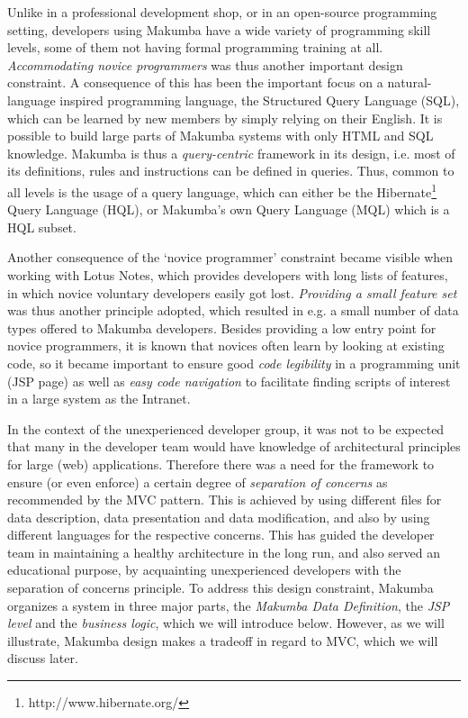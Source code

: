 \documentclass{chi2009}
\begin{document}
Unlike in a professional development shop, or in an open-source programming setting, developers using Makumba have a wide variety of programming skill levels, some of them not having formal programming training at all. \textit{Accommodating novice programmers} was thus another important design constraint.
A consequence of this has been the important focus on a natural-language inspired programming language, the Structured Query Language (SQL), which can be learned by new members by simply relying on their English. It is possible to build large parts of Makumba systems with only HTML and SQL knowledge. Makumba is thus a \textit{query-centric} framework in its design, i.e. most of its definitions, rules and instructions can be defined in queries. Thus, common to all levels is the usage of a query language, which can either be the Hibernate\footnote{http://www.hibernate.org/}  Query Language (HQL), or Makumba's own Query Language (MQL) which is a HQL subset. %

Another consequence of the `novice programmer' constraint became visible when working with Lotus Notes, which provides developers with long lists of features, in which novice  voluntary developers easily got lost. \textit{Providing a small feature set} was thus another principle adopted, which resulted in e.g. a small number of data types offered to  Makumba developers. Besides providing a low entry point for novice programmers, it is known that novices often learn by looking at existing code, so it became important to ensure good \textit{code legibility} in a programming unit (JSP page) as well as \textit{easy code navigation} to facilitate finding scripts of interest in a large system as the Intranet.

In the context of the unexperienced developer group, it was not  to be expected that many in the developer team would have knowledge of architectural principles for large (web) applications. Therefore there was a need for the framework to ensure (or even enforce) a certain degree of \textit{separation of concerns} as recommended by the MVC pattern.
This is achieved by using  different files for data description, data presentation and data modification, and also by using different languages for the respective concerns. This has guided the developer team in maintaining a healthy architecture in the long run, and also served an educational purpose, by acquainting unexperienced developers with the separation of concerns principle. To address this design constraint, Makumba organizes a system in three major parts, the \textit{Makumba Data Definition}, the \textit{JSP level} and the \textit{business logic}, which we will introduce below. However, as we will illustrate, Makumba design makes a tradeoff in regard to MVC, which we will discuss later.
\end{document}
